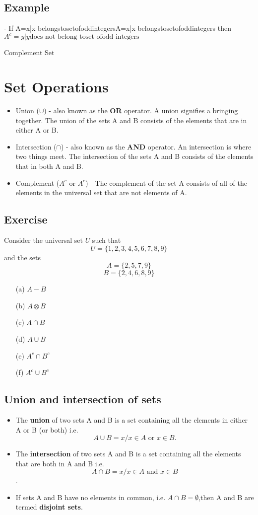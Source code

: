 \documentclass[11pt,a4paper,titlepage,oneside,openany]{article}
\numberwithin{equation}{section}
\numberwithin{algorithm}{section}
\numberwithin{figure}{section}
\numberwithin{table}{section}
\begin{document}
\subsection{Example} - If A={x|x belongstosetofoddintegers}A={x|x belongstosetofoddintegers} then $A^{c}={y|y \mbox{does not belong toset ofodd integers}}$

Complement Set
\newpage
\section*{Set Operations}
\begin{itemize}
	\item Union ($\cup$) - also known as the \textbf{OR} operator. A union signifies a bringing together. The union of the sets A and B consists of the elements that are in either A or B.
	\item Intersection ($\cap$) - also known as the \textbf{AND} operator. An intersection is where two things meet. The intersection of the sets A and B consists of the elements that in both A and B.
	\item Complement ($A^{c}$ or $A^{c}$) - The complement of the set A consists of all of the elements in the universal set that are not elements of A.
\end{itemize}
\subsection*{Exercise}
Consider the universal set $U$ such that
\[U=\{1,2,3,4,5,6,7,8,9\} \]
and the sets
\[A=\{2,5,7,9\} \]
\[B=\{2,4,6,8,9\} \]
\begin{multicols}{2}
\begin{itemize}
	\item[(a)] $A-B$
	\item[(b)] $A \otimes B$
	\item[(c)] $A \cap B$
	\item[(d)] $A \cup B$
	\item[(e)] $A^{c} \cap B^{c}$
	\item[(f)] $A^{c} \cup B^{c}$
\end{itemize}
\end{multicols}
\newpage
\subsection*{Union and intersection of sets}
\begin{itemize}
\item The \textbf{union} of two sets A and B is a set containing all the elements in
either A or B (or both)
i.e.
\[A \cup B = {x / x \in A \mbox{ or } x \in B}.\]
\item The \textbf{intersection} of two sets A and B is a set containing all the elements
that are both in A and B
i.e.
\[A \cap B = {x / x \in A \mbox{ and }x \in B}\].
\item If sets A and B have no elements in common, i.e. $A \cap B = \emptyset$,then A and B
are termed \textbf{disjoint sets}.
\end{itemize}
\newpage
\end{document}
